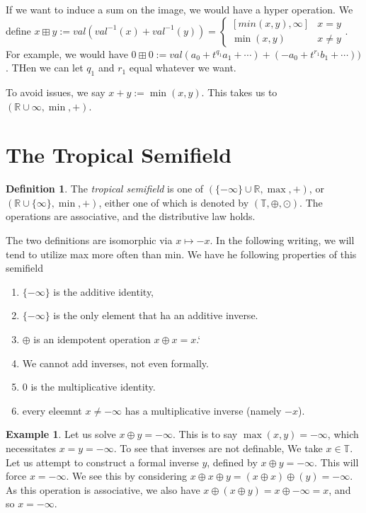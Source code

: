 \documentclass[12pt]{memoir}
\theoremstyle{definition}
\newtheorem{protoexample}{Example}[section]
\newenvironment{ex}
   {\begin{protoexample}}
   {\end{protoexample}}
\newtheorem{protodefinition}{Definition}[section]
\newenvironment{define}
   {\begin{protodefinition}}
   {\end{protodefinition}}
\def\RR{{\mathbb R}}
\begin{document}
If we want to induce a sum on the image, we would have a hyper operation. We define $x \boxplus y := val( val^{-1}(x) + val^{-1}(y) ) =\begin{cases} [min(x,y), \infty]  &x = y
\\
\min(x,y) & x \neq y\end{cases}$. For example, we would have $0 \boxplus 0 := val( a_0 +t^{q_1}a_1 + \cdots) + (-a_0 + t^{r_1}b_1 + \cdots ))$. THen we can let $q_1$ and $r_1$ equal whatever we want.

To avoid issues, we say $x+y := \min(x,y)$. This takes us to $(\RR \cup \infty, \min, +)$.

\section{The Tropical Semifield}

\begin{define}
    The \emph{tropical semifield} is one of $(\{- \infty\} \cup \RR, \max, +)$, or $(\RR \cup \{\infty\}, \min, +)$, either one of which is denoted by $(\mathbb{T}, \oplus, \odot)$. The operations are associative, and the distributive law holds.
\end{define}

The two definitions are isomorphic via $x \mapsto -x$. In the following writing, we will tend to utilize max more often than min. We have he following properties of this semifield

\begin{enumerate}
    \item $\{-\infty\}$ is the additive identity,
    \item $\{-\infty\}$ is the only element that ha an additive inverse.
    \item $\oplus$ is an idempotent operation $x \oplus x = x$.`
    \item We cannot add inverses, not even formally.
    \item $0$ is the multiplicative identity.
    \item every eleemnt $x \neq - \infty$ has a multiplicative inverse (namely $-x$).
\end{enumerate}

\begin{ex}
    Let us solve $x \oplus y = - \infty$. This is to say $\max(x,y) = - \infty$, which necessitates $x=y = -\infty$. To see that inverses are not definable, We take $x \in \mathbb{T}$. Let us attempt to construct a formal inverse $y$, defined by $x \oplus y = -\infty$. This will  force $x = -\infty$. We see this by considering $x \oplus x \oplus y= (x\oplus x) \oplus (y) = -\infty$. As this operation is associative, we also have $x \oplus (x \oplus y) = x \oplus - \infty = x$, and so $x= -\infty$.
\end{ex}
\end{document}
